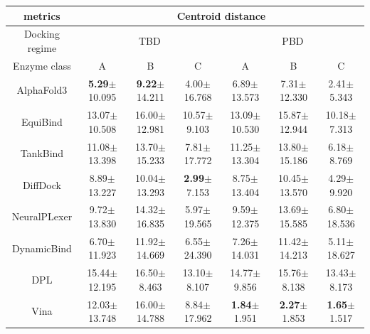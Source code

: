 \documentclass[12pt, a4paper, portrait]{article}
\begin{document}
    \begin{table}
        \begin{tabular}{|c|*{6}{c}|}
            \hline
            metrics & \multicolumn{6}{|c|}{Centroid distance} \\
            \hline

            Docking regime & \multicolumn{3}{|c|}{TBD} & \multicolumn{3}{|c|}{PBD} \\
            \hline

            Enzyme class & A & B & C & A & B & C \\
            AlphaFold3&\textbf{5.29}$\pm$ 10.095&\textbf{9.22}$\pm$ 14.211&4.00$\pm$ 16.768&6.89$\pm$ 13.573&7.31$\pm$ 12.330&2.41$\pm$ 5.343\\ 
            EquiBind&13.07$\pm$ 10.508&16.00$\pm$ 12.981&10.57$\pm$ 9.103&13.09$\pm$ 10.530&15.87$\pm$ 12.944&10.18$\pm$ 7.313\\ 
            TankBind&11.08$\pm$ 13.398&13.70$\pm$ 15.233&7.81$\pm$ 17.772&11.25$\pm$ 13.304&13.80$\pm$ 15.186&6.18$\pm$ 8.769\\ 
            DiffDock&8.89$\pm$ 13.227&10.04$\pm$ 13.293&\textbf{2.99}$\pm$ 7.153&8.75$\pm$ 13.404&10.45$\pm$ 13.570&4.29$\pm$ 9.920\\ 
            NeuralPLexer&9.72$\pm$ 13.830&14.32$\pm$ 16.835&5.97$\pm$ 19.565&9.59$\pm$ 12.375&13.69$\pm$ 15.585&6.80$\pm$ 18.536\\ 
            DynamicBind&6.70$\pm$ 11.923&11.92$\pm$ 14.669&6.55$\pm$ 24.390&7.26$\pm$ 14.031&11.42$\pm$ 14.213&5.11$\pm$ 18.627\\ 
            DPL&15.44$\pm$ 12.195&16.50$\pm$ 8.463&13.10$\pm$ 8.107&14.77$\pm$ 9.856&15.76$\pm$ 8.138&13.43$\pm$ 8.173\\ 
            Vina&12.03$\pm$ 13.748&16.00$\pm$ 14.788&8.84$\pm$ 17.962&\textbf{1.84}$\pm$ 1.951&\textbf{2.27}$\pm$ 1.853&\textbf{1.65}$\pm$ 1.517\\ 

        \end{tabular}
    \end{table}
\end{document}
